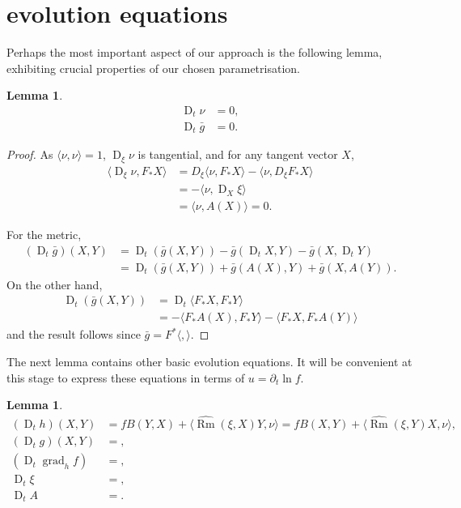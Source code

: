\documentclass{amsart}
\newtheorem{lemma}[theorem]{Lemma}
\theoremstyle{definition}
\theoremstyle{remark}
\newcommand{\ip}[2]{\ensuremath{\langle{#1},{#2}\rangle}}
\DeclareMathOperator{\grad}{grad}
\DeclareMathOperator{\Rm}{Rm}
\DeclareMathOperator{\D}{D}
\numberwithin{equation}{section}
\begin{document}
\section{evolution equations}

Perhaps the most important aspect of our approach is the following lemma, exhibiting crucial properties of our chosen parametrisation.

\begin{lemma}
\begin{align}
\D_t \nu & = 0, \\
\D_t \bar{g} &= 0.
\end{align}
\end{lemma}

\begin{proof}
As $\ip{\nu}{\nu} = 1$, $\D_{\xi} \nu$ is tangential, and for any tangent vector $X$,
\[
\begin{split}
\ip{\D_{\xi} \nu}{F_{\ast} X} &= D_{\xi} \ip{\nu}{F_{\ast}X} - \ip{\nu}{D_{\xi} F_{\ast} X} \\
&= -\ip{\nu}{\D_{X}\xi} \\
&= \ip{\nu}{A(X)} = 0.
\end{split}
\]

For the metric,
\[
\begin{split}
\left(\D_t \bar{g}\right) (X, Y) &= \D_t (\bar{g}(X, Y)) - \bar{g}(\D_t X, Y) - \bar{g}(X, \D_t Y) \\
&= \D_t (\bar{g}(X, Y)) + \bar{g}(A(X), Y) + \bar{g}(X, A(Y)).
\end{split}
\]
On the other hand,
\[
\begin{split}
\D_t (\bar{g}(X, Y)) &= \D_t \ip{F_{\ast} X}{F_{\ast} Y} \\
&= -\ip{F_{\ast} A(X)}{F_{\ast} Y} - \ip{F_{\ast} X}{F_{\ast} A(Y)}
\end{split}
\]
and the result follows since $\bar{g} = F^{\ast} \ip{}{}$.
\end{proof}

The next lemma contains other basic evolution equations. It will be convenient at this stage to express these equations in terms of $u = \partial_t \ln f$.
\begin{lemma}
\begin{align*}
(\D_t h) (X, Y) &= f B(Y, X) + \ip{\widehat{\Rm}(\xi, X) Y}{\nu} =  f B(X, Y) + \ip{\widehat{\Rm}(\xi, Y) X}{\nu},\\
(\D_t g) (X, Y) &= ,\\
(\D_t \grad_h f) &= ,\\
\D_t \xi &= ,\\
\D_t A &= .
\end{align*}
\end{lemma}
\end{document}
